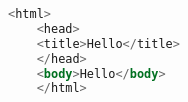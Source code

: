 \documentclass{article}
\begin{document}
	\begin{lstlisting}[language=sql]
	<html>
	<head>
	<title>Hello</title>
	</head>
	<body>Hello</body>
	</html>
	\end{lstlisting}
\end{document}
